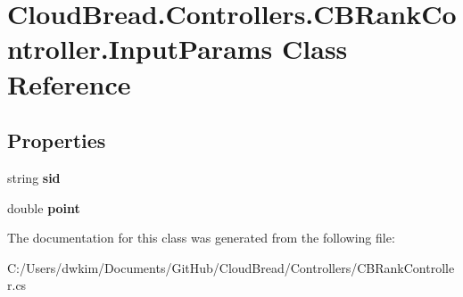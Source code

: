 \hypertarget{a00076}{}\section{Cloud\+Bread.\+Controllers.\+C\+B\+Rank\+Controller.\+Input\+Params Class Reference}
\label{a00076}
\subsection*{Properties}
\begin{DoxyCompactItemize}
\item 
string {\bfseries sid}\hypertarget{a00076_a4c7c042b79f056fd99dc06c53a27ce84}{}\label{a00076_a4c7c042b79f056fd99dc06c53a27ce84}

\item 
double {\bfseries point}\hypertarget{a00076_a8eb10e4dbcdc60810081039ce689983b}{}\label{a00076_a8eb10e4dbcdc60810081039ce689983b}

\end{DoxyCompactItemize}


The documentation for this class was generated from the following file\+:\begin{DoxyCompactItemize}
\item 
C\+:/\+Users/dwkim/\+Documents/\+Git\+Hub/\+Cloud\+Bread/\+Controllers/C\+B\+Rank\+Controller.\+cs\end{DoxyCompactItemize}
